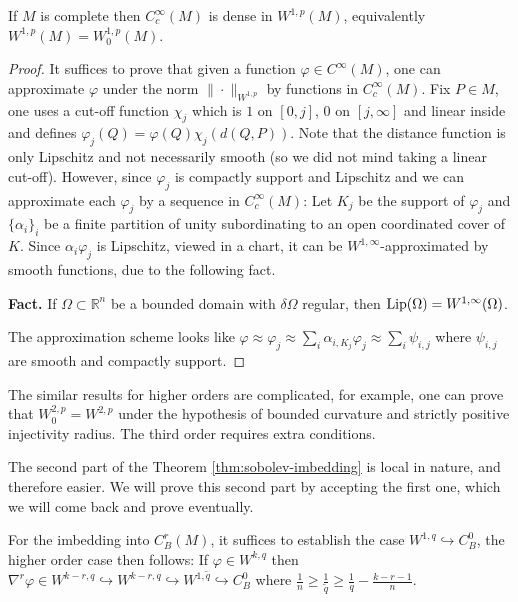 \begin{proposition}[\( W^{1,p} = W_0^{1,p} \)]
\label{prop:Cc-dense-W1p}
If \(M\) is complete then \(C_c^\infty(M)\) is dense in \(W^{1,p}(M)\), equivalently \(W^{1,p}(M) = W^{1,p}_0(M)\).
\end{proposition}
\begin{proof}
It suffices to prove that given a function \(\varphi\in C^\infty(M)\), one can
approximate \(\varphi\) under the norm \(\|\cdot \|_{W^{1,p}}\) by functions in \(C^\infty_c(M)\). Fix \(P\in M\), one uses a cut-off function \(\chi_j\) which is \(1\) on \([0,j]\),
\(0\) on \([j,\infty]\) and linear inside and defines \(\varphi_j (Q) = \varphi(Q)
\chi_j(d(Q,P))\). Note that the distance function is only Lipschitz and not necessarily
smooth (so we did not mind taking a linear cut-off). However, since \(\varphi_j\) is compactly
support and Lipschitz and we can approximate each \(\varphi_j\) by a sequence in \(C_c^\infty(M)\): Let \(K_j\) be the support of \(\varphi_j\) and \(\{\alpha_i\}_i\) be
a finite partition of unity subordinating to an open coordinated cover of \(K\). Since
\(\alpha_i\varphi_j\) is Lipschitz, viewed in a chart, it can be \(W^{1,\infty}\)-approximated by smooth functions, due to the following fact.

\textbf{Fact.} If \(\Omega\subset \mathbb{R}^n\) be a bounded domain with \(\delta \Omega\)
regular, then \({\rm Lip}(\Omega) = W^{1,\infty}(\Omega)\).

The approximation scheme looks like
\(\varphi \approx \varphi_j \approx \sum_i \alpha_{i,K_j}\varphi_j \approx\sum_i \psi_{i,j}\)
where \(\psi_{i,j}\) are smooth and compactly support.
\end{proof}

\begin{remark}
The similar results for higher orders are complicated, for example, one can prove that \(W^{2,p}_0 = W^{2,p}\) under the hypothesis of bounded curvature and strictly positive
injectivity radius. The third order requires extra conditions.
\end{remark}

The second part of the Theorem \ref{thm:sobolev-imbedding} is local in nature, and therefore easier. We will prove
this second part by accepting the first one, which we will come back and prove eventually.

For the imbedding
into \(C^r_B(M)\), it suffices to establish the case \(W^{1,q} \hookrightarrow C^0_B\), the higher order case then follows: If \(\varphi\in W^{k,q}\) then \(\nabla^r\varphi\in W^{k-r,q} \hookrightarrow
   W^{k-r,q} \hookrightarrow W^{1,\tilde q} \hookrightarrow C^0_B\)
where \(\frac{1}{n} \geq \frac{1}{\tilde q}\geq \frac{1}{q}-\frac{k-r-1}{n}\). 

